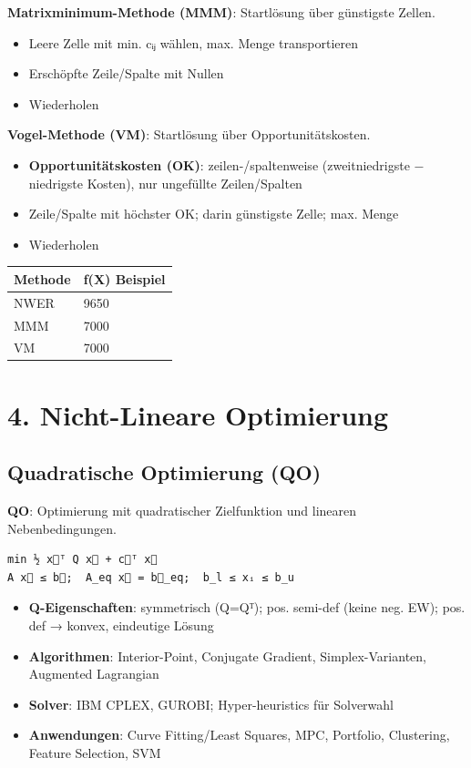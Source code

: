 \documentclass[11pt, a4paper]{article}
\begin{document}
\textbf{Matrixminimum-Methode (MMM)}: Startlösung über günstigste Zellen.

\begin{itemize}
  \item Leere Zelle mit min. cᵢⱼ wählen, max. Menge transportieren
  \item Erschöpfte Zeile/Spalte mit Nullen
  \item Wiederholen
\end{itemize}

\textbf{Vogel-Methode (VM)}: Startlösung über Opportunitätskosten.

\begin{itemize}
  \item \textbf{Opportunitätskosten (OK)}: zeilen-/spaltenweise (zweitniedrigste − niedrigste Kosten), nur ungefüllte Zeilen/Spalten
  \item Zeile/Spalte mit höchster OK; darin günstigste Zelle; max. Menge
  \item Wiederholen
\end{itemize}


{\small
\begin{tabularx}{\linewidth}{XX}
\hline
\rowcolor{tableheadbg}
{\color{white}\textbf{Methode}} & {\color{white}\textbf{f(X) Beispiel}} \\[2pt]
\hline
\endhead
\hline
\endfoot
NWER & 9650 \\
MMM & 7000 \\
VM & 7000 \\
\end{tabularx}
}



\section{4. Nicht-Lineare Optimierung}


\subsection{Quadratische Optimierung (QO)}

\textbf{QO}: Optimierung mit quadratischer Zielfunktion und linearen Nebenbedingungen.

\begin{lstlisting}
min ½ x⃗ᵀ Q x⃗ + c⃗ᵀ x⃗
A x⃗ ≤ b⃗;  A_eq x⃗ = b⃗_eq;  b_l ≤ xᵢ ≤ b_u
\end{lstlisting}


\begin{itemize}
  \item \textbf{Q-Eigenschaften}: symmetrisch (Q=Qᵀ); pos. semi-def (keine neg. EW); pos. def → konvex, eindeutige Lösung
  \item \textbf{Algorithmen}: Interior-Point, Conjugate Gradient, Simplex-Varianten, Augmented Lagrangian
  \item \textbf{Solver}: IBM CPLEX, GUROBI; Hyper-heuristics für Solverwahl
  \item \textbf{Anwendungen}: Curve Fitting/Least Squares, MPC, Portfolio, Clustering, Feature Selection, SVM
\end{itemize}
\end{document}
